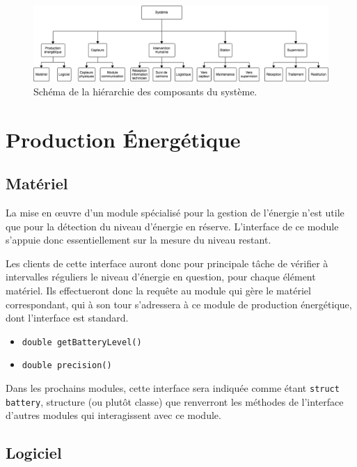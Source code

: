 
\begin{figure}[htb]
\centering
\includegraphics[scale=0.6, angle=90]{system-scheme}
\caption{Schéma de la hiérarchie des composants du système.}
\end{figure}





\section{Production Énergétique}

\subsection{Matériel}

La mise en œuvre d'un module spécialisé pour la gestion de l'énergie n'est utile que pour la détection du niveau d'énergie en réserve. L'interface de ce module s'appuie donc essentiellement sur la mesure du niveau restant.

Les clients de cette interface auront donc pour principale tâche de vérifier à intervalles réguliers le niveau d'énergie en question, pour chaque élément matériel. Ils effectueront donc la requête au module qui gère le matériel correspondant, qui à son tour s'adressera à ce module de production énergétique, dont l'interface est standard.

\begin{itemize}
\item \tt{double getBatteryLevel()}
\item \tt{double precision()}
\end{itemize}

Dans les prochains modules, cette interface sera indiquée comme étant \texttt{struct battery}, structure (ou plutôt classe) que renverront les méthodes de l'interface d'autres modules qui interagissent avec ce module.


\subsection{Logiciel}

